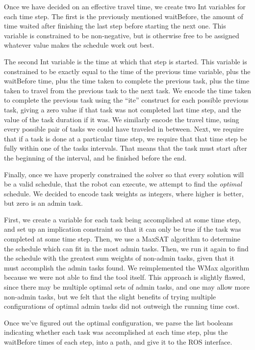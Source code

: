 \documentclass{article}
\begin{document}
Once we have decided on an effective travel time,
we create two Int variables for each time step.
The first is the previously mentioned waitBefore,
the amount of time waited after finishing the last step
before starting the next one.
This variable is constrained to be non-negative,
but is otherwise free to be assigned whatever value
makes the schedule work out best.

The second Int variable
is the time at which that step is started.
This variable is constrained
to be exactly equal to the time
of the previous time variable,
plus the waitBefore time,
plus the time taken to complete the previous task,
plus the time taken to travel
from the previous task to the next task.
We encode the time taken to complete the previous task
using the ``ite'' construct for each possible previous task,
giving a zero value if that task was not completed last time step,
and the value of the task duration if it was.
We similarly encode the travel time,
using every possible pair of tasks we could have traveled in between.
Next, we require that if a task is done at a particular time step,
we require that that time step be fully within one of the tasks intervals.
That means that the task must start after the beginning of the interval,
and be finished before the end.

Finally, once we have properly constrained the solver
so that every solution will be a valid schedule,
that the robot can execute,
we attempt to find the \textit{optimal} schedule.
We decided to encode task weights as integers,
where higher is better,
but zero is an admin task.

First, we create a variable
for each task being accomplished
at some time step,
and set up an implication constraint
so that it can only be true
if the task was completed at some time step.
Then, we use a MaxSAT algorithm
to determine the schedule which can fit in the most admin tasks.
Then, we run it again to find the schedule with the greatest
sum weights of non-admin tasks,
given that it must accomplish the admin tasks found.
We reimplemented
the WMax algorithm \cite{vZ}
because we were not able to find the tool itself.
This approach is slightly flawed,
since there may be multiple optimal sets of admin tasks,
and one may allow more non-admin tasks,
but we felt that the slight benefits
of trying multiple configurations of optimal admin tasks
did not outweigh the running time cost.

Once we've figured out the optimal configuration,
we parse the list booleans
indicating whether each task was accomplished at each time step,
plus the waitBefore times of each step,
into a path, and give it to the ROS interface.
\end{document}
